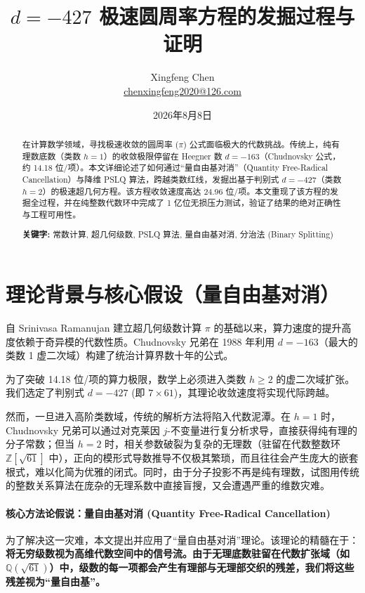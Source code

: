 \documentclass[11pt,a4paper]{ctexart}
\title{$d=-427$ 极速圆周率方程的发掘过程与证明}
\author{Xingfeng Chen \\ \href{mailto:chenxingfeng2020@126.com}{chenxingfeng2020@126.com}}
\date{2026年8月8日}
\begin{document}
\maketitle
\pagestyle{plain}

\begin{abstract}
在计算数学领域，寻找极速收敛的圆周率 ($\pi$) 公式面临极大的代数挑战。传统上，纯有理数底数（类数 $h=1$）的收敛极限停留在 Heegner 数 $d=-163$（Chudnovsky 公式，约 14.18 位/项）。本文详细论述了如何通过“量自由基对消”（Quantity Free-Radical Cancellation）与降维 PSLQ 算法，跨越类数红线，发掘出基于判别式 $d=-427$（类数 $h=2$）的极速超几何方程。该方程收敛速度高达 24.96 位/项。本文重现了该方程的发掘全过程，并在纯整数代数环中完成了 1 亿位无损压力测试，验证了结果的绝对正确性与工程可用性。

\vspace{0.5em}
\noindent\textbf{关键字:} 常数计算, 超几何级数, PSLQ 算法, 量自由基对消, 分治法 (Binary Splitting)
\end{abstract}

\section{理论背景与核心假设（量自由基对消）}

自 Srinivasa Ramanujan 建立超几何级数计算 $\pi$ 的基础以来，算力速度的提升高度依赖于奇异模的代数性质。Chudnovsky 兄弟在 1988 年利用 $d=-163$（最大的类数 1 虚二次域）构建了统治计算界数十年的公式。

为了突破 14.18 位/项的算力极限，数学上必须进入类数 $h \ge 2$ 的虚二次域扩张。我们选定了判别式 $d=-427$ (即 $7 \times 61$)，其理论收敛速度将实现代际跨越。

然而，一旦进入高阶类数域，传统的解析方法将陷入代数泥潭。在 $h=1$ 时，Chudnovsky 兄弟可以通过对克莱因 $j$-不变量进行复分析求导，直接获得纯有理的分子常数；但当 $h=2$ 时，相关参数破裂为复杂的无理数（驻留在代数整数环 $\mathbb{Z}[\sqrt{61}]$ 中），正向的模形式导数推导不仅极其繁琐，而且往往会产生庞大的嵌套根式，难以化简为优雅的闭式。同时，由于分子投影不再是纯有理数，试图用传统的整数关系算法在庞杂的无理系数中直接盲搜，又会遭遇严重的维数灾难。

\paragraph{核心方法论假说：量自由基对消 (Quantity Free-Radical Cancellation)}
为了解决这一灾难，本文提出并应用了“量自由基对消”理论。该理论的精髓在于：\textbf{将无穷级数视为高维代数空间中的信号流。由于无理底数驻留在代数扩张域（如 $\mathbb{Q}(\sqrt{61})$）中，级数的每一项都会产生有理部与无理部交织的残差，我们将这些残差视为“量自由基”。} 
\end{document}
